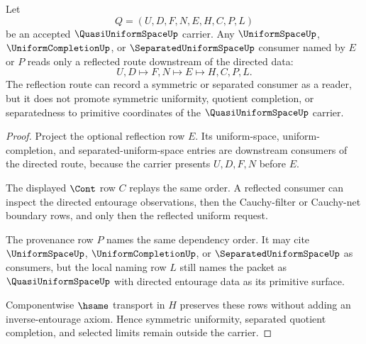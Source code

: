 \begin{theorem}
\label{thm:quasi-uniform-space-uniform-reflection-route}
Let
$$
Q=(U,D,F,N,E,H,C,P,L)
$$
be an accepted $\QuasiUniformSpaceUp$ carrier. Any $\UniformSpaceUp$, $\UniformCompletionUp$, or $\SeparatedUniformSpaceUp$ consumer named by $E$ or $P$ reads only a reflected route downstream of the directed data:
$$
U,D \longmapsto F,N \longmapsto E \longmapsto H,C,P,L .
$$
The reflection route can record a symmetric or separated consumer as a reader, but it does not promote symmetric uniformity, quotient completion, or separatedness to primitive coordinates of the $\QuasiUniformSpaceUp$ carrier.
\end{theorem}
\begin{proof}
Project the optional reflection row $E$. Its uniform-space, uniform-completion, and separated-uniform-space entries are downstream consumers of the directed route, because the carrier presents $U,D,F,N$ before $E$.

The displayed $\Cont$ row $C$ replays the same order. A reflected consumer can inspect the directed entourage observations, then the Cauchy-filter or Cauchy-net boundary rows, and only then the reflected uniform request.

The provenance row $P$ names the same dependency order. It may cite $\UniformSpaceUp$, $\UniformCompletionUp$, or $\SeparatedUniformSpaceUp$ as consumers, but the local naming row $L$ still names the packet as $\QuasiUniformSpaceUp$ with directed entourage data as its primitive surface.

Componentwise $\hsame$ transport in $H$ preserves these rows without adding an inverse-entourage axiom. Hence symmetric uniformity, separated quotient completion, and selected limits remain outside the carrier.
\end{proof}

